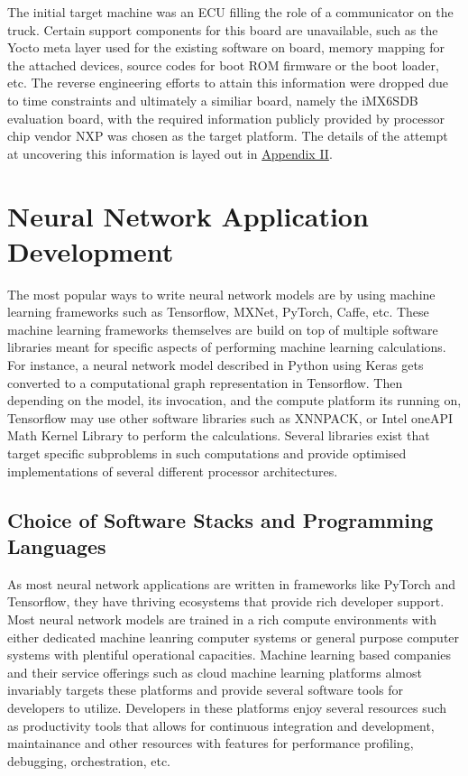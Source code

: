The initial target machine was an ECU filling the role of a communicator on the truck. Certain support components for this board are unavailable, such as the Yocto meta layer used for the existing software on board, memory mapping for the attached devices, source codes for boot ROM firmware or the boot loader, etc. The reverse engineering efforts to attain this information were dropped due to time constraints and ultimately a similiar board, namely the iMX6SDB evaluation board, with the required information publicly provided by processor chip vendor NXP was chosen as the target platform. The details of the attempt at uncovering this information is layed out in \hyperref[rtc-c300]{Appendix II}.

\section{Neural Network Application Development}

The most popular ways to write neural network models are by using machine learning frameworks such as Tensorflow, MXNet, PyTorch, Caffe, etc. These machine learning frameworks themselves are build on top of multiple software libraries meant for specific aspects of performing machine learning calculations. For instance, a neural network model described in Python using Keras gets converted to a computational graph representation in Tensorflow. Then depending on the model, its invocation, and the compute platform its running on, Tensorflow may use other software libraries such as XNNPACK, or Intel oneAPI Math Kernel Library to perform the calculations. Several libraries exist that target specific subproblems in such computations and provide optimised implementations of several different processor architectures.

\subsection{Choice of Software Stacks and Programming Languages}

As most neural network applications are written in frameworks like PyTorch and Tensorflow, they have thriving ecosystems that provide rich developer support. Most neural network models are trained in a rich compute environments with either dedicated machine leanring computer systems or general purpose computer systems with plentiful operational capacities. Machine learning based companies and their service offerings such as cloud machine learning platforms almost invariably targets these platforms and provide several software tools for developers to utilize. Developers in these platforms enjoy several resources such as productivity tools that allows for continuous integration and development, maintainance and other resources with features for performance profiling, debugging, orchestration, etc.

